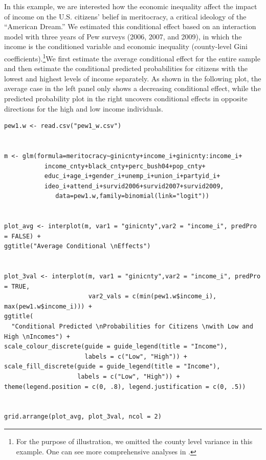 \documentclass[
  article]{jss}
\begin{document}
In this example, we are interested how the economic inequality affect
the impact of income on the U.S. citizens' belief in meritocracy, a
critical ideology of the ``American Dream.'' We estimated this
conditional effect based on an interaction model with three years of Pew
surveys (2006, 2007, and 2009), in which the income is the conditioned
variable and economic inequality (county-level Gini
coefficients).\footnote{For the purpose of illustration, we omitted the
  county level variance in this example. One can see more comprehensive
  analyses in \citep{solt2017}.}We first estimate the average
conditional effect for the entire sample and then estimate the
conditional predicted probabilities for citizens with the lowest and
highest levels of income separately. As shown in the following plot, the
average case in the left panel only shows a decreasing conditional
effect, while the predicted probability plot in the right uncovers
conditional effects in opposite directions for the high and low income
individuals.

\begin{verbatim}
pew1.w <- read.csv("pew1_w.csv")


m <- glm(formula=meritocracy~ginicnty+income_i+ginicnty:income_i+
           income_cnty+black_cnty+perc_bush04+pop_cnty+
           educ_i+age_i+gender_i+unemp_i+union_i+partyid_i+
           ideo_i+attend_i+survid2006+survid2007+survid2009,
              data=pew1.w,family=binomial(link="logit"))
 
              
plot_avg <- interplot(m, var1 = "ginicnty",var2 = "income_i", predPro = FALSE) + 
ggtitle("Average Conditional \nEffects")


plot_3val <- interplot(m, var1 = "ginicnty",var2 = "income_i", predPro = TRUE, 
                       var2_vals = c(min(pew1.w$income_i), max(pew1.w$income_i))) +
ggtitle(
  "Conditional Predicted \nProbabilities for Citizens \nwith Low and High \nIncomes") +
scale_colour_discrete(guide = guide_legend(title = "Income"), 
                      labels = c("Low", "High")) + 
scale_fill_discrete(guide = guide_legend(title = "Income"), 
                    labels = c("Low", "High")) +
theme(legend.position = c(0, .8), legend.justification = c(0, .5))


grid.arrange(plot_avg, plot_3val, ncol = 2)
\end{verbatim}
\end{document}
